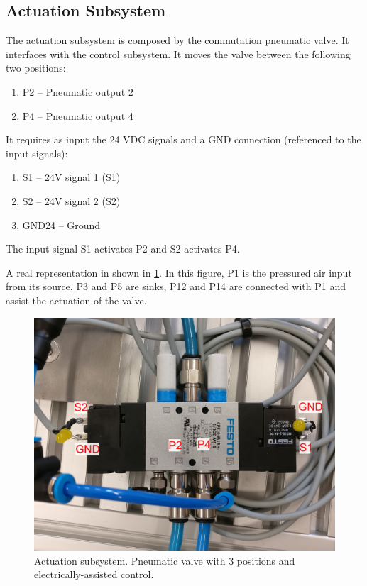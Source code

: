 \documentclass[twoside,a4paper]{refart}
\begin{document}
\subsection{Actuation Subsystem}\label{sub:actuation_system}
The actuation subsystem is composed by the commutation pneumatic valve. It interfaces with the control subsystem. It moves the valve between the following two positions:

\begin{enumerate}
	\item
	P2 -- Pneumatic output 2
	\item
	P4 -- Pneumatic output 4 
\end{enumerate}

It requires as input the 24 VDC signals and a GND connection (referenced to the input signals):
\begin{enumerate}
	\item
	S1 -- 24V signal 1 (S1)
	\item
	S2 -- 24V signal 2 (S2)
	\item
	GND24 -- Ground
\end{enumerate}
The input signal S1 activates P2 and S2 activates P4.

A real representation in shown in \cref{fig:ph_actuation}. In this figure, P1 is the pressured air input from its source, P3 and P5 are sinks, P12 and P14 are connected with P1 and assist the actuation of the valve.

\begin{figure}[H]
	\centering
	\includegraphics[width=1.0\linewidth]{ph_actuation}
	\caption{Actuation subsystem. Pneumatic valve with 3 positions and electrically-assisted control.}
	\label{fig:ph_actuation}
\end{figure}
\end{document}
